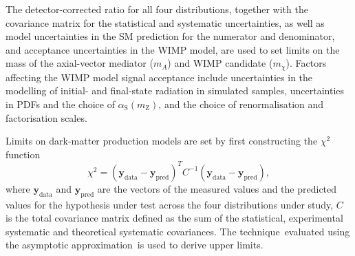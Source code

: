 \documentclass[cernpreprint,txfonts,UKenglish,texlive=2016]{\ATLASLATEXPATH atlasdoc}
\begin{document}
The detector-corrected ratio for all four distributions, together with the covariance matrix for the statistical and systematic uncertainties, 
as well as model uncertainties in the SM prediction for the numerator
and denominator, and acceptance uncertainties in the WIMP model,
are used to set limits on the mass of the axial-vector mediator ($m_A$) and WIMP candidate ($m_\chi$).
Factors affecting the WIMP model signal acceptance include uncertainties in the modelling of initial- and
final-state radiation in simulated samples, uncertainties in 
PDFs and the choice of $\alpha_{\mathrm{S}}\left(m_{\mathrm{Z}}\right)$, and the choice of renormalisation and factorisation scales.

Limits on dark-matter production models are set by first constructing the $\chi^2$ function
\begin{equation*}
\chi^2 = {(\mathbf{y}_\mathrm{data} - \mathbf{y}_\mathrm{pred})}^{T} C^{-1} (\mathbf{y}_\mathrm{data} - \mathbf{y}_\mathrm{pred}),
\end{equation*}
where $\mathbf{y}_\mathrm{data}$ and $\mathbf{y}_\mathrm{pred}$ are the vectors of the measured \Rmiss{} values 
and the predicted \Rmiss{} values for the hypothesis under test across the four distributions under study, $C$
is the total covariance matrix defined as the sum of the statistical, experimental systematic and theoretical systematic covariances. 
The \cls technique\,\cite{Read:2002hq,Junk:1999kv} evaluated using the asymptotic 
approximation\,\cite{Cowan:2010js} is used to derive upper limits.
\end{document}
